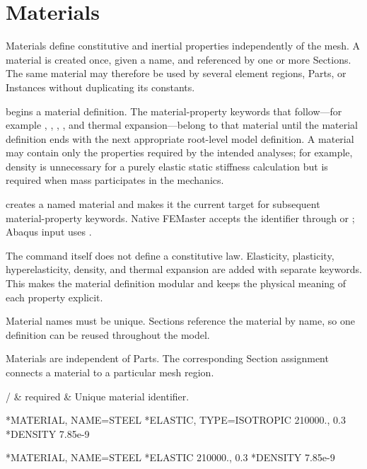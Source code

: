 \chapter{Materials}
\label{chap:materials}

Materials define constitutive and inertial properties independently of the mesh. A material is created once, given a name, and referenced by one or more Sections. The same material may therefore be used by several element regions, Parts, or Instances without duplicating its constants.

 begins a material definition. The material-property keywords that follow---for example , , , , and thermal expansion---belong to that material until the material definition ends with the next appropriate root-level model definition. A material may contain only the properties required by the intended analyses; for example, density is unnecessary for a purely elastic static stiffness calculation but is required when mass participates in the mechanics.


 creates a named material and makes it the current target for subsequent material-property keywords. Native FEMaster accepts the identifier through  or ; Abaqus input uses .

The command itself does not define a constitutive law. Elasticity, plasticity, hyperelasticity, density, and thermal expansion are added with separate keywords. This makes the material definition modular and keeps the physical meaning of each property explicit.

Material names must be unique. Sections reference the material by name, so one definition can be reused throughout the model.

Materials are independent of Parts. The corresponding Section assignment connects a material to a particular mesh region.

\begin{keywordparameters}
 /  & required & Unique material identifier. \\
\end{keywordparameters}

\exampleheading

\begin{dialectexamples}
\begin{femasterdeck}
*MATERIAL, NAME=STEEL
*ELASTIC, TYPE=ISOTROPIC
210000., 0.3
*DENSITY
7.85e-9
\end{femasterdeck}
\begin{abaqusdeck}
*MATERIAL, NAME=STEEL
*ELASTIC
210000., 0.3
*DENSITY
7.85e-9
\end{abaqusdeck}
\end{dialectexamples}

